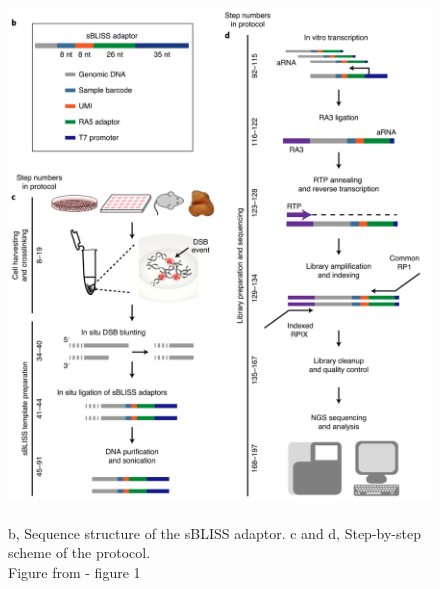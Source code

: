 \begin{figure}
\centering
\includegraphics[width=12cm, height=14cm]{figures/sBLISS_workflow.png}
\caption{b, Sequence structure of the sBLISS adaptor. c and d, Step-by-step scheme of the protocol.\\
Figure from \protect\cite{bouwman2020genome} - figure 1}
\label{fig:sbliss_workflow}
\end{figure}

